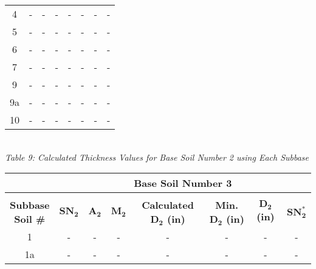 \documentclass{article}
\begin{document}
\begin{center}
\begin{spacing}{1.6}
\begin{tabular}{|c|ccccccc|}
                                            4       & -     & -    & -    & -                    & -              & -         & -       \\
                                            5       & -     & -    & -    & -                    & -              & -         & -       \\
                                            6       & -     & -    & -    & -                    & -              & -         & -       \\
                                            7       & -     & -    & -    & -                    & -              & -         & -       \\
                                            9       & -     & -    & -    & -                    & -              & -         & -       \\
                                            9a      & -     & -    & -    & -                    & -              & -         & -       \\
                                            10      & -     & -    & -    & -                    & -              & -         & -       \\\hline
        \end{tabular}
        \vspace{3mm}
        \emph{\\Table 9: Calculated Thickness Values for Base Soil Number 2 using Each Subbase\\}
        \vspace{7mm}
        \begin{tabular}{|c|ccccccc|}
            \hline    
            \multicolumn{1}{|l}{}                     & \multicolumn{7}{c|}{\textbf{Base Soil Number 3}}                                              \\\hline
            &&&&&&&\\
             \shortstack[c]{\textbf{Subbase}\\\textbf{Soil \#}} & $\bm{SN_2}$ & $\bm{A_2}$ & $\bm{M_2}$ & \textbf{Calculated $\bm{D_2}$ (in)} & \textbf{Min. $\bm{D_2}$ (in)} & \textbf{$\bm{D_2}$ (in)} & $\bm{SN_2^*}$  \\\hline
                                            1       & -     & -    & -    & -                    & -              & -         & -       \\
                                            1a      & -     & -    & -    & -                    & -              & -         & -       \\

\end{tabular}
\end{spacing}
\end{center}
\end{document}
